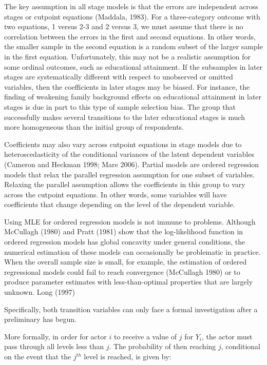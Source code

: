 The key assumption in all stage models is that the errors are independent across stages or cutpoint equations (Maddala, 1983). For a three-category outcome with two equations, 1 versus 2-3 and 2 versus 3, we must assume that there is no correlation between the errors in the first and second equations. In other words, the smaller sample in the second equation is a random subset of the larger sample in the first equation. Unfortunately, this may not be a realistic assumption for some ordinal outcomes, such as educational attainment. If the subsamples in later stages are systematically different with respect to unobserved or omitted variables, then the coefficients in later stages may be biased. For instance, the finding of weakening family background effects on educational attainment in later stages is due in part to this type of sample selection bias. The group that successfully makes several transitions to the later educational stages is much more homogeneous than the initial group of respondents.

Coefficients may also vary across cutpoint equations in stage models due to heteroscedasticity of the conditional variances of the latent dependent variables (Cameron and Heckman 1998; Mare 2006). Partial models are ordered regression models that relax the parallel regression assumption for one subset of variables. Relaxing the parallel assumption allows the coefficients in this group to vary across the cutpoint equations. In other words, some variables will have coefficients that change depending on the level of the dependent variable.

Using MLE for ordered regression models is not immune to problems. Although McCullagh (1980) and Pratt (1981) show that the log-likelihood function in ordered regression models has global concavity under general conditions, the numerical estimation of these models can occasionally be problematic in practice. When the overall sample size is small, for example, the estimation of ordered regressional models could fail to reach convergence (McCullagh 1980) or to produce parameter estimates with less-than-optimal properties that are largely unknown. Long (1997)

Specifically, both transition variables can only face a formal investigation after a preliminary has begun.

More formally, in order for actor $i$ to receive a value of $j$ for $Y_{i}$, the actor must pass through all levels less than $j$. The probability of then reaching $j$, conditional on the event that the $j^{th}$ level is reached, is given by:

